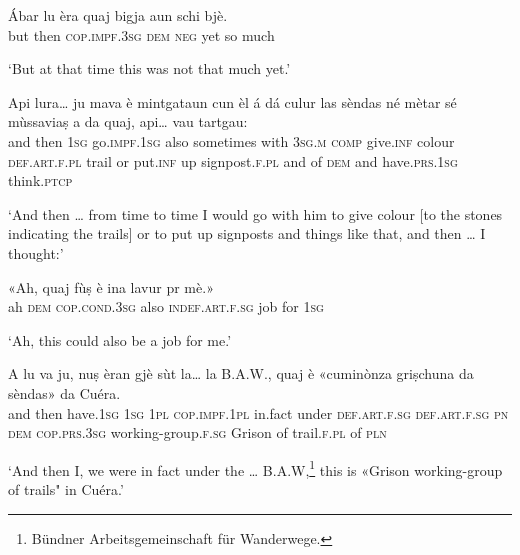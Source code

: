 \begin{linenumbers}
\gll  Ábar lu èra quaj bigja aun schi bjè.  \\
but then \textsc{cop.impf.3sg} \textsc{dem} \textsc{neg} yet  so much  \\
\end{linenumbers}
\medskip
\glt `But at that time this was not that much yet.'
\medskip

\begin{linenumbers}
\gll  Api lura… ju mava è mintgataun cun èl á dá culur las sèndas né mètar sé mùssaviaṣ a da quaj, api… vau tartgau:  \\
and then \textsc{1sg} go.\textsc{impf.1sg} also sometimes with \textsc{3sg.m} \textsc{comp} give.\textsc{inf} colour \textsc{def.art.f.pl} trail or  put.\textsc{inf} up signpost.\textsc{f.pl}   and of \textsc{dem} and have.\textsc{prs.1sg} think.\textsc{ptcp} \\
\end{linenumbers}
\medskip
\glt `And then … from time to time I would go with him to give colour [to the stones indicating the trails] or to put up signposts and things like that, and then … I thought:'
\medskip

\begin{linenumbers}
\gll «Ah, quaj fùṣ è ina lavur pr mè.»   \\
ah \textsc{dem} \textsc{cop.cond.3sg} also \textsc{indef.art.f.sg} job for \textsc{1sg} \\
\end{linenumbers}
\medskip
\glt `Ah, this could also be a job for me.'
\medskip

\begin{linenumbers}
\gll A lu va ju, nuṣ èran gjè sùt la… la B.A.W., quaj è «cuminònza griṣchuna da sèndas» da Cuéra.    \\
and then have.\textsc{1sg} \textsc{1sg} \textsc{1pl} \textsc{cop.impf.1pl} in.fact under \textsc{def.art.f.sg}  \textsc{def.art.f.sg}  \textsc{pn} \textsc{dem} \textsc{cop.prs.3sg} working-group.\textsc{f.sg} Grison of  trail.\textsc{f.pl} of \textsc{pln} \\
\end{linenumbers}
\medskip
\glt `And then I, we were in fact under the … B.A.W,\footnote {Bündner Arbeitsgemeinschaft für Wanderwege.} this is «Grison working-group of trails" in Cuéra.'
\medskip

